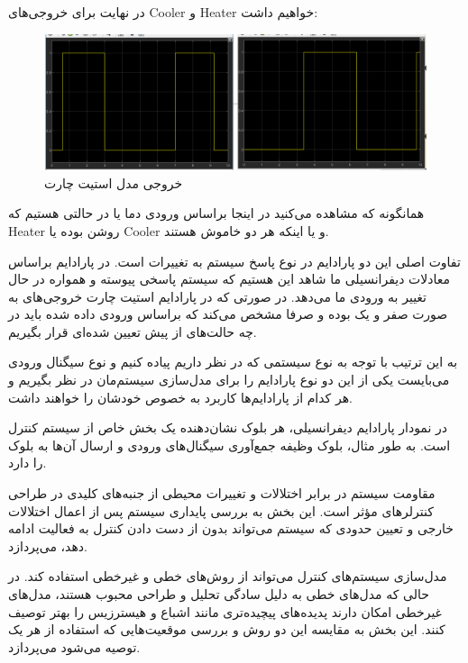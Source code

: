 \newpage

در نهایت برای خروجی‌های
Cooler
و
Heater
خواهیم داشت:

\begin{figure}[H]
    \centering
    \includegraphics[width = \textwidth]{commons/image5.png}
    \caption{خروجی مدل استیت چارت}
\end{figure}

همانگونه که مشاهده می‌کنید در اینجا براساس ورودی دما یا در حالتی هستیم که 
Heater
روشن بوده یا
Cooler
و یا اینکه هر دو خاموش هستند.

تفاوت اصلی این دو پارادایم در نوع پاسخ سیستم به تغییرات است. در پارادایم براساس معادلات دیفرانسیلی ما شاهد این هستیم که سیستم پاسخی پیوسته و همواره در حال تغییر به ورودی ما می‌دهد. در صورتی که در پارادایم استیت چارت خروجی‌های به صورت صفر و یک بوده و صرفا مشخص می‌کند که براساس ورودی داده شده باید در چه حالت‌های از پیش تعیین شده‌ای قرار بگیریم.

به این ترتیب با توجه به نوع سیستمی که در نظر داریم پیاده کنیم و نوع سیگنال ورودی می‌بایست یکی از این دو نوع پارادایم را برای مدل‌سازی سیستم‌مان در نظر بگیریم و هر کدام از پارادایم‌ها کاربرد به خصوص خودشان را خواهند داشت.

در نمودار پارادایم دیفرانسیلی، هر بلوک نشان‌دهنده یک بخش خاص از سیستم کنترل است. به طور مثال، بلوک
وظیفه جمع‌آوری سیگنال‌های ورودی و ارسال آن‌ها به بلوک 
را دارد.

مقاومت سیستم در برابر اختلالات و تغییرات محیطی از جنبه‌های کلیدی در طراحی کنترلرهای مؤثر است. این بخش به بررسی پایداری سیستم پس از اعمال اختلالات خارجی و تعیین حدودی که سیستم می‌تواند بدون از دست دادن کنترل به فعالیت ادامه دهد، می‌پردازد.

مدل‌سازی سیستم‌های کنترل می‌تواند از روش‌های خطی و غیرخطی استفاده کند. در حالی که مدل‌های خطی به دلیل سادگی تحلیل و طراحی محبوب هستند، مدل‌های غیرخطی امکان دارند پدیده‌های پیچیده‌تری مانند اشباع و هیسترزیس را بهتر توصیف کنند. این بخش به مقایسه این دو روش و بررسی موقعیت‌هایی که استفاده از هر یک توصیه می‌شود می‌پردازد.